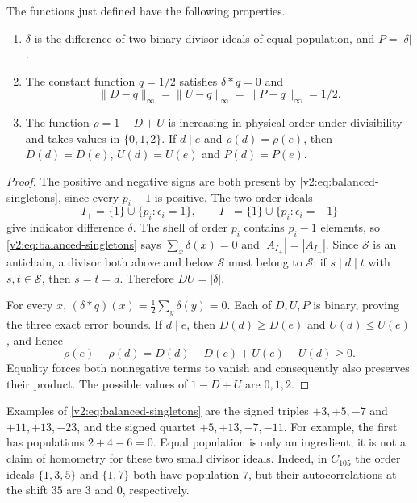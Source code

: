 \begin{lemma}\label{v2:lem:balanced-block}
The functions just defined have the following properties.
\begin{enumerate}
\item $\delta$ is the difference of two binary divisor ideals of equal
population, and $P=|\delta|$.
\item The constant function $q=1/2$ satisfies $\delta*q=0$ and
\[
 \|D-q\|_\infty=\|U-q\|_\infty=\|P-q\|_\infty=1/2.
\]
\item The function $\rho=1-D+U$ is increasing in physical order under
divisibility and takes values in $\{0,1,2\}$.  If $d\mid e$ and
$\rho(d)=\rho(e)$, then $D(d)=D(e)$, $U(d)=U(e)$ and $P(d)=P(e)$.
\end{enumerate}
\end{lemma}
\begin{proof}
The positive and negative signs are both present by
\eqref{v2:eq:balanced-singletons}, since every $p_i-1$ is positive.
The two order ideals
\[
 I_+=\{1\}\cup\{p_i:\epsilon_i=1\},\qquad
 I_-=\{1\}\cup\{p_i:\epsilon_i=-1\}
\]
give indicator difference $\delta$.  The shell of order $p_i$ contains
$p_i-1$ elements, so \eqref{v2:eq:balanced-singletons} says
$\sum_x\delta(x)=0$ and $|A_{I_+}|=|A_{I_-}|$.
Since $\mathcal S$ is an antichain, a divisor both above and below
$\mathcal S$ must belong to $\mathcal S$: if $s\mid d\mid t$ with
$s,t\in\mathcal S$, then $s=t=d$.  Therefore $DU=|\delta|$.

For every $x$, $(\delta*q)(x)=\tfrac12\sum_y\delta(y)=0$.
Each of $D,U,P$ is binary, proving the three exact error bounds.
If $d\mid e$, then $D(d)\ge D(e)$ and $U(d)\le U(e)$, and hence
\[
 \rho(e)-\rho(d)=D(d)-D(e)+U(e)-U(d)\ge0.
\]
Equality forces both nonnegative terms to vanish and consequently also
preserves their product.  The possible values of $1-D+U$ are $0,1,2$.
\end{proof}

Examples of \eqref{v2:eq:balanced-singletons} are the signed triples
$+3,+5,-7$ and $+11,+13,-23$, and the signed quartet
$+5,+13,-7,-11$.  For example, the first has populations
$2+4-6=0$.  Equal population is only an ingredient; it is not a claim
of homometry for these two small divisor ideals.  Indeed, in $C_{105}$
the order ideals $\{1,3,5\}$ and $\{1,7\}$ both have population $7$,
but their autocorrelations at the shift $35$ are $3$ and $0$, respectively.

